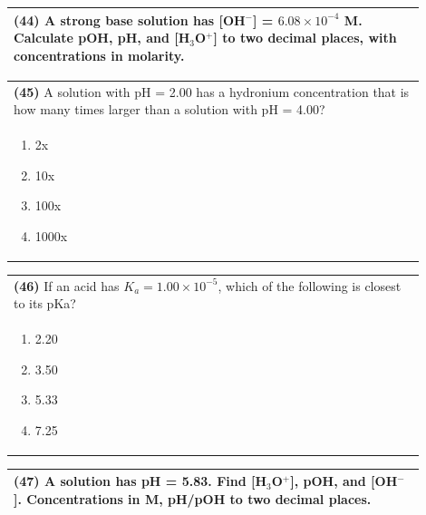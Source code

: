 \documentclass{article}
\begin{document}
\noindent\begin{tabular}{|p{0.9\linewidth}|}
\hline
\textbf{(44)} A strong base solution has [OH$^-$] = $6.08\times10^{-4}$ M. Calculate pOH, pH, and [H$_3$O$^+$] to two decimal places, with concentrations in molarity. \\[4cm]
\hline
\end{tabular}
\newpage

\noindent\begin{tabular}{|p{0.9\linewidth}|}
\hline
\textbf{(45)} A solution with pH = 2.00 has a hydronium concentration that is how many times larger than a solution with pH = 4.00? \\[0.2cm]
\begin{minipage}{0.85\linewidth}
\begin{enumerate}[label=\alph*.]
\item 2x \item 10x \item 100x \item 1000x
\end{enumerate}
\end{minipage}\\[0.2cm]
\hline
\end{tabular}

\noindent\begin{tabular}{|p{0.9\linewidth}|}
\hline
\textbf{(46)} If an acid has $K_a = 1.00\times10^{-5}$, which of the following is closest to its pKa? \\[0.2cm]
\begin{minipage}{0.85\linewidth}
\begin{enumerate}[label=\alph*.]
\item 2.20 \item 3.50 \item 5.33 \item 7.25
\end{enumerate}
\end{minipage}\\[0.2cm]
\hline
\end{tabular}

\noindent\begin{tabular}{|p{0.9\linewidth}|}
\hline
\textbf{(47)} A solution has pH = 5.83. Find [H$_3$O$^+$], pOH, and [OH$^-$]. Concentrations in M, pH/pOH to two decimal places. \\[4cm]
\hline
\end{tabular}
\end{document}
